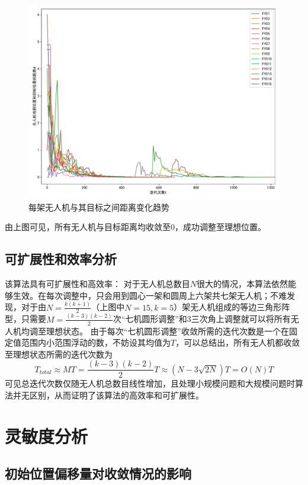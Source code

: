 \documentclass[withoutpreface,bwprint]{cumcmthesis} %
\begin{document}
\begin{figure}[H]
    \centering
    \includegraphics[width=0.7\linewidth]{figures/t15_0.pdf}
    \caption{每架无人机与其目标之间距离变化趋势}
    \label{fig:T15_Convergence}
\end{figure}
由上图可见，所有无人机与目标距离均收敛至0，成功调整至理想位置。



\subsection{可扩展性和效率分析}
该算法具有可扩展性和高效率：
对于无人机总数目$N$很大的情况，本算法依然能够生效。在每次调整中，只会用到圆心一架和圆周上六架共七架无人机；不难发现，对于由$N=\frac{k(k+1)}{2}$（上图中$N=15, k=5$）架无人机组成的等边三角形阵型，只需要$M=\frac{(k-3)(k-2)}{2}$次“七机圆形调整”和3三次角上调整就可以将所有无人机均调至理想状态。
由于每次“七机圆形调整”收敛所需的迭代次数是一个在固定值范围内小范围浮动的数，不妨设其均值为$T$，可以总结出，所有无人机都收敛至理想状态所需的迭代次数为
\begin{equation}
    T_{total} \approx MT = \frac{(k-3)(k-2)}{2} T \approx (N-3\sqrt{2N}) T = O(N)T
\end{equation}
可见总迭代次数仅随无人机总数目线性增加，且处理小规模问题和大规模问题时算法并无区别，从而证明了该算法的高效率和可扩展性。



\section{灵敏度分析}
\subsection{初始位置偏移量对收敛情况的影响}\label{startpos}
\end{document}
